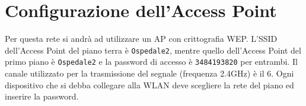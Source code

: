 \section{Configurazione dell'Access Point}
\hspace{24pt}Per questa rete si andrà ad utilizzare un AP con crittografia WEP. L'SSID dell'Access Point del piano terra è 
\texttt{Ospedale2}, mentre quello dell'Access Point del primo piano è \texttt{Ospedale2} e la password 
di accesso è \texttt{3484193820} per entrambi. Il canale utilizzato per la trasmissione del segnale 
(frequenza 2.4GHz) è il 6. Ogni dispositivo che si debba collegare alla WLAN deve scegliere la rete del piano 
ed inserire la password.
